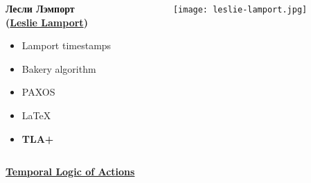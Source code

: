 \documentclass[
  11pt,aspectratio=1610,pdf,hyperref={unicode,colorlinks=false}
]{beamer}
\begin{document}
\begin{frame}[c]
  \begin{columns}
    \begin{column}{.45\textwidth}      
      {\Large\bf
        Лесли Лэмпорт\\
        (\href{https://lamport.azurewebsites.net}{Leslie Lamport})
      }\\
      \vspace{3ex}
      \large
      \vspace{1ex}
      \begin{itemize}
        \item Lamport timestamps
        \item Bakery algorithm
        \item PAXOS
        \item LaTeX
        \item {\bf TLA+}
      \end{itemize}
    \end{column}
    \begin{column}{.5\textwidth}
      \centering
      \texttt{[image: leslie-lamport.jpg]}
    \end{column}
  \end{columns}
\end{frame}  

\begin{frame}[c]  
  \centering\Large\bf
  \href{https://lamport.azurewebsites.net/pubs/lamport-actions.pdf}{Temporal Logic of Actions}
\end{frame}
\end{document}
